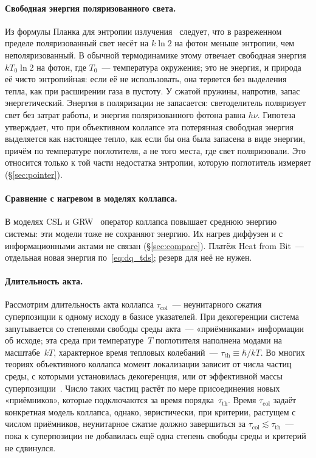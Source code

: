 \documentclass[11pt,a4paper]{article}
\newcommand{\Sref}[1]{\hyperref[#1]{\S\ref{#1}}}
\begin{document}
\paragraph{Свободная энергия поляризованного света.}
Из формулы Планка для энтропии излучения~\cite{planck1914} следует, что в разреженном пределе поляризованный свет несёт на $k\ln 2$ на фотон меньше энтропии, чем неполяризованный. В обычной термодинамике этому отвечает свободная энергия $kT_0\ln 2$ на фотон, где $T_0$~--- температура окружения; это не энергия, и природа её чисто энтропийная: если её не использовать, она теряется без выделения тепла, как при расширении газа в пустоту. У сжатой пружины, напротив, запас энергетический. Энергия в поляризации не запасается: светоделитель поляризует свет без затрат работы, и энергия поляризованного фотона равна $h\nu$. Гипотеза утверждает, что при объективном коллапсе эта потерянная свободная энергия выделяется как настоящее тепло, как если бы она была запасена в виде энергии, причём по температуре поглотителя, а не того места, где свет поляризовали. Это относится только к той части недостатка энтропии, которую поглотитель измеряет (\Sref{sec:pointer}).

\paragraph{Сравнение с нагревом в моделях коллапса.}
В моделях CSL и GRW~\cite{grw1986,pearle1989,bassi2013} оператор коллапса повышает среднюю энергию системы: эти модели тоже не сохраняют энергию. Их нагрев диффузен и с информационными актами не связан (\Sref{sec:compare}). Платёж Heat from Bit~--- отдельная новая энергия по~\eqref{eq:dq_tds}; резерв для неё не нужен.

\paragraph{Длительность акта.}
Рассмотрим длительность акта коллапса $\tau_{\mathrm{col}}$~--- неунитарного сжатия суперпозиции к одному исходу в базисе указателей. При декогеренции система запутывается со степенями свободы среды акта~--- «приёмниками» информации об исходе; эта среда при температуре~$T$ поглотителя наполнена модами на масштабе~$kT$, характерное время тепловых колебаний~--- $\tau_{\mathrm{th}} \equiv \hbar/kT$. Во многих теориях объективного коллапса момент локализации зависит от числа частиц среды, с которыми установилась декогеренция, или от эффективной массы суперпозиции~\cite{grw1986,bassi2013,zurek2009,ponfilenok2026threshold,ponfilenok2026branch}. Число таких частиц растёт по мере присоединения новых «приёмников», которые подключаются за время порядка~$\tau_{\mathrm{th}}$. Время $\tau_{\mathrm{col}}$ задаёт конкретная модель коллапса, однако, эвристически, при критерии, растущем с числом приёмников, неунитарное сжатие должно завершиться за $\tau_{\mathrm{col}} \lesssim \tau_{\mathrm{th}}$~--- пока к суперпозиции не добавилась ещё одна степень свободы среды и критерий не сдвинулся.
\end{document}
